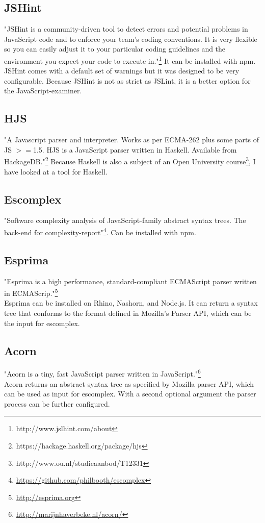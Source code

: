 \documentclass{article}
\begin{document}
\subsection{JSHint}
"JSHint is a community-driven tool to detect errors and potential problems in JavaScript code and to enforce your team's coding conventions. It is very flexible so you can easily adjust it to your particular coding guidelines and the environment you expect your code to execute in."\footnote{http://www.jslhint.com/about}
It can be installed with npm.
JSHint comes with a default set of warnings but it was designed to be very configurable.
Because JSHint is not as strict as JSLint, it is a better option for the JavaScript-examiner.

\subsection{HJS}
"A Javascript parser and interpreter. Works as per ECMA-262 plus some parts of JS $>=$1.5.
HJS is a JavaScript parser written in Haskell. Available from HackageDB."\footnote{https://hackage.haskell.org/package/hjs}
Because Haskell is also a subject of an Open University course\footnote{http://www.ou.nl/studieaanbod/T12331}, I have looked at a tool for Haskell.

\subsection{Escomplex}
"Software complexity analysis of JavaScript-family abstract syntax trees. The back-end for complexity-report"\footnote{\url{https://github.com/philbooth/escomplex}}.
Can be installed with npm.

\subsection{Esprima}
"Esprima is a high performance, standard-compliant ECMAScript parser written in ECMAScrip."\footnote{\url{http://esprima.org}}\\
Esprima can be installed on Rhino, Nashorn, and Node.js.
It can return a syntax tree that conforms to the format defined in Mozilla's Parser API, which can be the input for escomplex.

\subsection{Acorn}
"Acorn is a tiny, fast JavaScript parser written in JavaScript."\footnote{\url{http://marijnhaverbeke.nl/acorn/}}\\
Acorn returns an abstract syntax tree as specified by Mozilla parser API, which can be used as input for escomplex.
With a second optional argument the parser process can be further configured.
\end{document}
